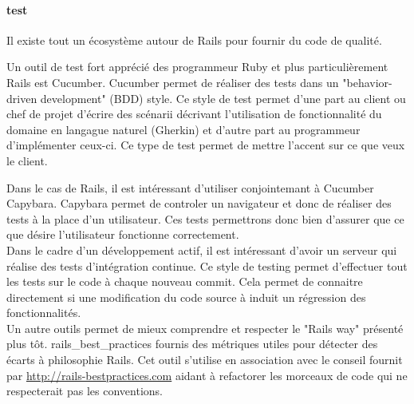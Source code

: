 \paragraph{test}
Il existe tout un écosystème autour de Rails pour fournir du code de qualité. %

Un outil de test fort apprécié des programmeur Ruby et plus particulièrement Rails est Cucumber. Cucumber permet de réaliser des tests dans un "behavior-driven development" (BDD) style. Ce style de test permet d'une part au client ou chef de projet d'écrire des scénarii décrivant l'utilisation de fonctionnalité du domaine en langague naturel (Gherkin) et d'autre part au programmeur d'implémenter ceux-ci. Ce type de test permet de mettre l'accent sur ce que veux le client.

Dans le cas de Rails, il est intéressant d'utiliser conjointemant à Cucumber Capybara. Capybara permet de controler un navigateur et donc de réaliser des tests à la place d'un utilisateur. Ces tests permettrons donc bien d'assurer que ce que désire l'utilisateur fonctionne correctement.\\

Dans le cadre d'un développement actif, il est intéressant d'avoir un serveur qui réalise des tests d'intégration continue. Ce style de testing permet d'effectuer tout les tests sur le code à chaque nouveau commit. Cela permet de connaitre directement si une modification du code source à induit un régression des fonctionnalités.\\

Un autre outils permet de mieux comprendre et respecter le "Rails way" présenté plus tôt. rails\_best\_practices fournis des métriques utiles pour détecter des écarts à philosophie Rails. Cet outil s'utilise en association avec le conseil fournit par \url{http://rails-bestpractices.com} aidant à refactorer les morceaux de code qui ne respecterait pas les conventions.
